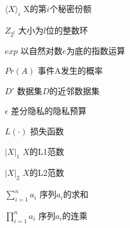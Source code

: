 
\begin{notation}

  \begin{notationlist}{2em}
    \item[$\displaystyle \langle X\rangle_i$] X的第$i$个秘密份额
    \item[$\displaystyle Z_{2^l}$] 大小为$l$位的整数环
    \item[$\displaystyle exp$] 以自然对数$e$为底的指数运算
    \item[$\displaystyle Pr(A)$] 事件A发生的概率
    \item[$\displaystyle D'$] 数据集$D$的近邻数据集
    \item[$\displaystyle \epsilon$] 差分隐私的隐私预算
    \item[$\displaystyle L(\cdot)$] 损失函数
    \item[$\displaystyle |X|_1$] $X$的L1范数
    \item[$\displaystyle |X|_2$] $X$的L2范数
    \item[$\displaystyle \sum_{i=1}^n a_i$] 序列$a_i$的求和
    \item[$\displaystyle \prod_{i=1}^n a_i$] 序列$a_i$的连乘
  \end{notationlist}

\end{notation}





